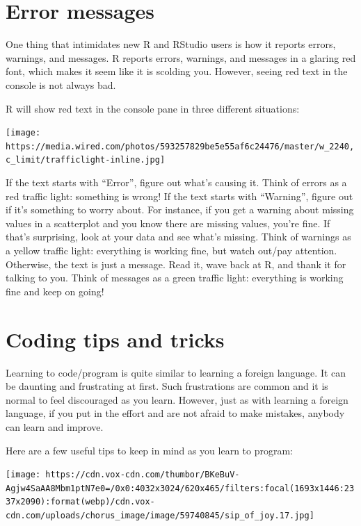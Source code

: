\documentclass[
]{book}
\begin{document}
\hypertarget{error-messages}{%
\section{Error messages}\label{error-messages}}

One thing that intimidates new R and RStudio users is how it reports
errors, warnings, and messages. R reports errors, warnings, and messages
in a glaring red font, which makes it seem like it is scolding you.
However, seeing red text in the console is not always bad.

R will show red text in the console pane in three different situations:

\texttt{[image: https://media.wired.com/photos/593257829be5e55af6c24476/master/w\_2240,c\_limit/trafficlight-inline.jpg]}

If the text starts with ``Error'', figure out what's causing it. Think
of errors as a red traffic light: something is wrong! If the text starts
with ``Warning'', figure out if it's something to worry about. For
instance, if you get a warning about missing values in a scatterplot and
you know there are missing values, you're fine. If that's surprising,
look at your data and see what's missing. Think of warnings as a yellow
traffic light: everything is working fine, but watch out/pay attention.
Otherwise, the text is just a message. Read it, wave back at R, and
thank it for talking to you. Think of messages as a green traffic light:
everything is working fine and keep on going!

\hypertarget{coding-tips-and-tricks}{%
\section{Coding tips and tricks}\label{coding-tips-and-tricks}}

Learning to code/program is quite similar to learning a foreign
language. It can be daunting and frustrating at first. Such frustrations
are common and it is normal to feel discouraged as you learn. However,
just as with learning a foreign language, if you put in the effort and
are not afraid to make mistakes, anybody can learn and improve.

Here are a few useful tips to keep in mind as you learn to program:

\texttt{[image: https://cdn.vox-cdn.com/thumbor/BKeBuV-Agjw4SaAA8Mbm1ptN7e0=/0x0:4032x3024/620x465/filters:focal(1693x1446:2337x2090):format(webp)/cdn.vox-cdn.com/uploads/chorus\_image/image/59740845/sip\_of\_joy.17.jpg]}
\end{document}
